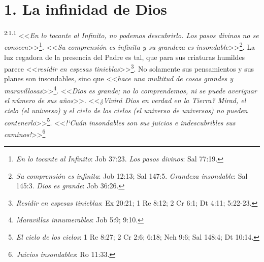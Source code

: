 \section*{1. La infinidad de Dios}
\par
\textsuperscript{2:1.1} <<\textit{En lo tocante al Infinito, no podemos descubrirlo. Los pasos divinos no se conocen}>>\footnote{\textit{En lo tocante al Infinito}: Job 37:23. \textit{Los pasos divinos}: Sal 77:19.}. <<\textit{Su comprensión es infinita y su grandeza es insondable}>>\footnote{\textit{Su comprensión es infinita}: Job 12:13; Sal 147:5. \textit{Grandeza insondable}: Sal 145:3. \textit{Dios es grande}: Job 36:26.}. La luz cegadora de la presencia del Padre es tal, que para sus criaturas humildes parece <<\textit{residir en espesas tinieblas}>>\footnote{\textit{Residir en espesas tinieblas}: Ex 20:21; 1 Re 8:12; 2 Cr 6:1; Dt 4:11; 5:22-23.}. No solamente sus pensamientos y sus planes son insondables, sino que <<\textit{hace una multitud de cosas grandes y maravillosas}>>\footnote{\textit{Maravillas innumerables}: Job 5:9; 9:10.}. <<\textit{Dios es grande; no lo comprendemos, ni se puede averiguar el número de sus años}>>. <<\textit{¿Vivirá Dios en verdad en la Tierra? Mirad, el cielo (el universo) y el cielo de los cielos (el universo de universos) no pueden contenerlo}>>\footnote{\textit{El cielo de los cielos}: 1 Re 8:27; 2 Cr 2:6; 6:18; Neh 9:6; Sal 148:4; Dt 10:14.}. <<\textit{!`Cuán insondables son sus juicios e indescubribles sus caminos!}>>\footnote{\textit{Juicios insondables}: Ro 11:33.}

